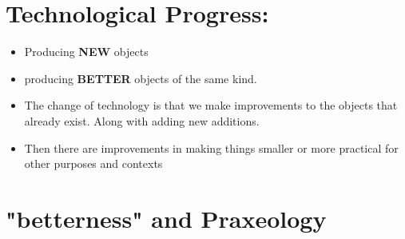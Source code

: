 \documentclass{article}
\begin{document}
\section*{Technological Progress:}
\begin{itemize}
  \item Producing \textbf{NEW} objects
  \item producing \textbf{BETTER} objects of the same kind.
  \item The change of technology is that we make
    improvements to the objects that already exist.
    Along with adding new additions.
  \item Then there are improvements in making things smaller
    or more practical for other purposes
    and contexts
\end{itemize}

\section*{"betterness" and Praxeology}
\end{document}
